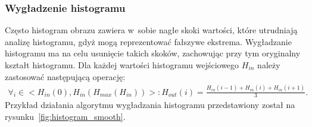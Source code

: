 \subsubsection{Wygładzenie histogramu}
Często histogram obrazu zawiera w~sobie nagłe skoki wartości, które utrudniają analizę histogramu, gdyż mogą reprezentować fałszywe ekstrema. Wygładzanie histogramu ma na celu usunięcie takich skoków, zachowując przy tym oryginalny kształt histogramu. Dla każdej wartości histogramu wejściowego \textit{$H_{in}$} należy zastosować następującą operację:
\begin{gather*}
  \forall_{i} \in \big< H_{in}(0), H_{in}(H_{max}(H_{in})) \big> :  H_{out}(i) = \frac{H_{in}(i-1) + H_{in}(i) + H_{in}(i+1)}{3}.
\end{gather*}
Przykład działania algorytmu wygładzania histogramu przedstawiony został na rysunku~\ref{fig:histogram_smooth}.
